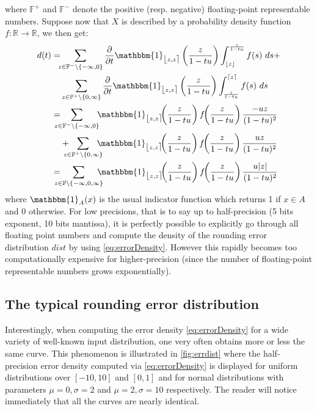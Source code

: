 \documentclass[10pt,conference]{IEEEtran}
\newcommand{\ceil}[1]{\lceil #1 \rceil}
\newcommand{\floor}[1]{\lfloor #1 \rfloor}
\newcommand{\fintvl}[1][x]{\mathlarger{\lfloor}#1,#1\mathlarger{\rceil}}
\newcommand{\F}{\mathbb{F}}
\newcommand{\R}{\mathbb{R}}
\newcommand{\one}{\mathbbm{1}}
\newcommand{\absv}[1]{\vert #1\vert}
\newcommand{\dt}{\frac{\partial}{\partial t}}
\begin{document}
where $\F^+$ and $\F^-$ denote the positive (resp. negative) floating-point representable numbers.
Suppose now that $X$ is described by a probability density function $f:\R\to\R$, we then get:
\begin{align}
d(t)
=&\hspace{-1ex}\sum_{z\in\F^-\setminus\{-\infty,0\}}\dt\one_{\fintvl[z]}\left(\frac{z}{1-tu}\right) \int^{\frac{z}{1-tu}}_{\floor{z}} f(s)~ds+\nonumber 
\\
&\sum_{z\in\F^+\setminus\{0,\infty\}}\dt\one_{\fintvl[z]}\left(\frac{z}{1-tu}\right) \int^{\ceil{z}}_{\frac{z}{1-tu}} f(s)~ds\nonumber 
\\
=&\hspace{-2ex}\sum_{z\in\F^-\setminus\{-\infty,0\}}\hspace{-1ex}\one_{\fintvl[z]}\hspace{-4pt}\left(\frac{z}{1-tu}\right) f\hspace{-3pt}\left(\frac{z}{1-tu}\right) \frac{-uz}{(1-tu)^2}\nonumber
\\
& +\hspace{-2ex}\sum_{z\in\F^+\setminus\{0.\infty\}}\hspace{-2ex}\one_{\fintvl[z]}\hspace{-4pt}\left(\frac{z}{1-tu}\right) f\hspace{-3pt}\left(\frac{z}{1-tu}\right) \frac{uz}{(1-tu)^2}\nonumber 
\\
=&\hspace{-2ex}\sum_{z\in\F\setminus\{-\infty,0,\infty\}}\hspace{-2ex}\one_{\fintvl[z]}\hspace{-4pt}\left(\frac{z}{1-tu}\right) f\hspace{-3pt}\left(\frac{z}{1-tu}\right) \frac{u\absv{z}}{(1-tu)^2}\label{eq:errorDensity}
\end{align}
where $\one_{A}(x)$ is the usual indicator function which returns 1 if $x\in A$ and 0 otherwise. For low precisions, that is to say up to half-precision (5 bits exponent, 10 bits mantissa), it is perfectly possible to explicitly go through all floating point numbers and compute the density of the rounding error distribution $dist$ by using \cref{eq:errorDensity}. However this rapidly becomes too computationally expensive for higher-precision (since the number of floating-point representable numbers grows exponentially).





\subsection{The typical rounding error distribution}
Interestingly, when computing the error density \cref{eq:errorDensity} for a wide variety of well-known input distribution, one very often obtains more or less the same curve. This phenomenon is illustrated in \cref{fig:errdist} where the half-precision error density computed via \cref{eq:errorDensity} is displayed for uniform distributions over $\left[-10,10\right]$ and $\left[0,1\right]$ and for normal distributions with parameters $\mu=0,\sigma=2$ and $\mu=2,\sigma=10$ respectively. The reader will notice immediately that all the curves are nearly identical.
\end{document}

